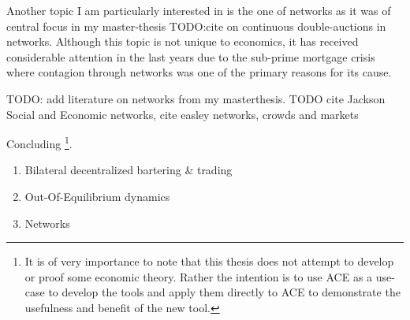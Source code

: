Another topic I am particularly interested in is the one of networks as it was of central focus in my master-thesis TODO:cite on continuous double-auctions in networks. Although this topic is not unique to economics, it has received considerable attention in the last years due to the sub-prime mortgage crisis where contagion through networks was one of the primary reasons for its cause.

TODO: add literature on networks from my masterthesis.
TODO cite Jackson Social and Economic networks, cite easley networks, crowds and markets

Concluding \footnote{It is of very importance to note that this thesis does not attempt to develop or proof some economic theory. Rather the intention is to use ACE as a use-case to develop the tools and apply them directly to ACE to demonstrate the usefulness and benefit of the new tool.}.

\begin{enumerate}
	\item Bilateral decentralized bartering \& trading
	\item Out-Of-Equilibrium dynamics
	\item Networks
\end{enumerate}


